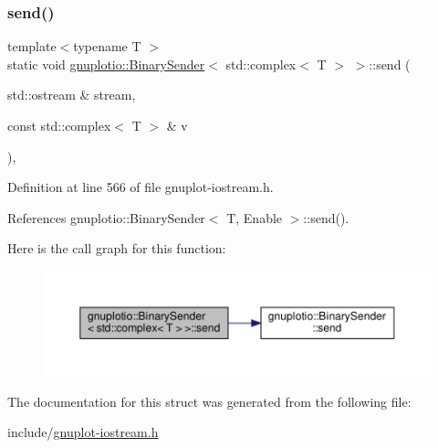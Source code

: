 \subsubsection{\texorpdfstring{send()}{send()}}
{\footnotesize\ttfamily template$<$typename T $>$ \\
static void \hyperlink{structgnuplotio_1_1_binary_sender}{gnuplotio\+::\+Binary\+Sender}$<$ std\+::complex$<$ T $>$ $>$\+::send (\begin{DoxyParamCaption}\item[{std\+::ostream \&}]{stream,  }\item[{const std\+::complex$<$ T $>$ \&}]{v }\end{DoxyParamCaption})\hspace{0.3cm}{\ttfamily [inline]}, {\ttfamily [static]}}



Definition at line 566 of file gnuplot-\/iostream.\+h.



References gnuplotio\+::\+Binary\+Sender$<$ T, Enable $>$\+::send().

Here is the call graph for this function\+:\nopagebreak
\begin{figure}[H]
\begin{center}
\leavevmode
\includegraphics[width=350pt]{structgnuplotio_1_1_binary_sender_3_01std_1_1complex_3_01_t_01_4_01_4_a759de700a1cd68000830a4b15a6fec49_cgraph}
\end{center}
\end{figure}


The documentation for this struct was generated from the following file\+:\begin{DoxyCompactItemize}
\item 
include/\hyperlink{gnuplot-iostream_8h}{gnuplot-\/iostream.\+h}\end{DoxyCompactItemize}
